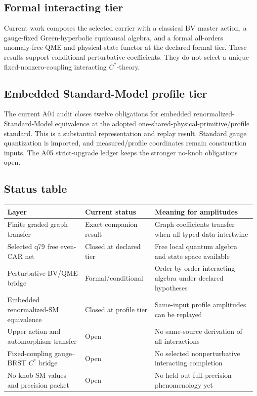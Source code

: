 \documentclass[11pt,a4paper]{article}
\numberwithin{equation}{section}
\theoremstyle{definition}
\theoremstyle{remark}
\begin{document}
\subsection{Formal interacting tier}

Current work composes the selected carrier with a classical BV master
action, a gauge-fixed Green-hyperbolic equicausal algebra, and a formal
all-orders anomaly-free QME and physical-state functor at the declared
formal tier.  These results support conditional perturbative coefficients.
They do not select a unique fixed-nonzero-coupling interacting
\(C^*\)-theory.

\subsection{Embedded Standard-Model profile tier}

The current A04 audit closes twelve obligations for embedded
renormalized-Standard-Model equivalence at the adopted
one-shared-physical-primitive/profile standard.  This is a substantial
representation and replay result.  Standard gauge quantization is imported,
and measured/profile coordinates remain construction inputs.  The A05
strict-upgrade ledger keeps the stronger no-knob obligations open.

\subsection{Status table}

\begin{center}
\small
\begin{tabular}{>{\raggedright\arraybackslash}p{}
                >{\raggedright\arraybackslash}p{}
                >{\raggedright\arraybackslash}p{}}
\toprule
Layer & Current status & Meaning for amplitudes\\
\midrule
Finite graded graph transfer &
Exact companion result &
Graph coefficients transfer when all typed data intertwine\\
Selected q79 free even-CAR net &
Closed at declared tier &
Free local quantum algebra and state space available\\
Perturbative BV/QME bridge &
Formal/conditional &
Order-by-order interacting algebra under declared hypotheses\\
Embedded renormalized-SM equivalence &
Closed at profile tier &
Same-input profile amplitudes can be replayed\\
Upper action and automorphism transfer &
Open &
No same-source derivation of all interactions\\
Fixed-coupling gauge--BRST \(C^*\) bridge &
Open &
No selected nonperturbative interacting completion\\
No-knob SM values and precision packet &
Open &
No held-out full-precision phenomenology yet\\
\bottomrule
\end{tabular}
\end{center}
\end{document}
